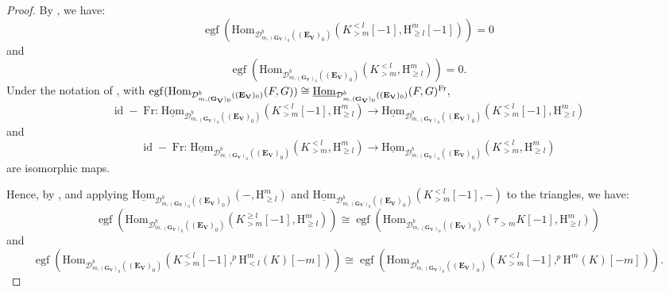 \documentclass[10pt,a4paper]{amsart}
\def\Hom{\mbox{\rm Hom}}  \def\ap{\mbox{\rm ap}}
\begin{document}
\begin{proof}
By \cite[Lemma 5.4.14(1)]{Pramod-2021}, we have:
\[
\operatorname{egf}\left(\mathrm{Hom}_{\mathcal{D}^b_{m,(\mathbf{G}_{\mathbf{V}})_0}((\mathbf{E}_{\mathbf{V}})_0)}(K_{>m}^{<l}[-1],\mathrm{H}^m_{\geq l}[-1])\right)=0
\]
and
\[
\operatorname{egf}\left(\mathrm{Hom}_{\mathcal{D}^b_{m,(\mathbf{G}_{\mathbf{V}})_0}((\mathbf{E}_{\mathbf{V}})_0)}(K_{>m}^{<l},\mathrm{H}^m_{\geq l})\right)=0.
\]
Under the notation of \cite[Remark 5.3.5]{Pramod-2021}, with $\operatorname{egf}(\Hom_{\mathcal{D}^b_{m,(\mathbf{G}_{\mathbf{V}})_0}((\mathbf{E}_{\mathbf{V}})_0)}(F,G))\cong \underline{\Hom}_{\mathcal{D}^b_{m,(\mathbf{G}_{\mathbf{V}})_0}((\mathbf{E}_{\mathbf{V}})_0)}(F,G)^{\operatorname{Fr}},$ $$\operatorname{id}-\operatorname{Fr:}\underline{\mathrm{Hom}}_{\mathcal{D}^b_{m,(\mathbf{G}_{\mathbf{V}})_0}((\mathbf{E}_{\mathbf{V}})_0)}(K_{>m}^{<l}[-1],\mathrm{H}^m_{\geq l})\rightarrow\underline{\mathrm{Hom}}_{\mathcal{D}^b_{m,(\mathbf{G}_{\mathbf{V}})_0}((\mathbf{E}_{\mathbf{V}})_0)}(K_{>m}^{<l}[-1],\mathrm{H}^m_{\geq l})$$ and $$\operatorname{id}-\operatorname{Fr:}\underline{\mathrm{Hom}}_{\mathcal{D}^b_{m,(\mathbf{G}_{\mathbf{V}})_0}((\mathbf{E}_{\mathbf{V}})_0)}(K_{>m}^{<l},\mathrm{H}^m_{\geq l})\rightarrow\underline{\mathrm{Hom}}_{\mathcal{D}^b_{m,(\mathbf{G}_{\mathbf{V}})_0}((\mathbf{E}_{\mathbf{V}})_0)}(K_{>m}^{<l},\mathrm{H}^m_{\geq l})$$ are isomorphic maps.

Hence, by \cite[Remark 5.3.5]{Pramod-2021}, and applying $\underline{\mathrm{Hom}}_{\mathcal{D}^b_{m,(\mathbf{G}_{\mathbf{V}})_0}((\mathbf{E}_{\mathbf{V}})_0)}(-,\mathrm{H}^m_{\geq l})$ and $\underline{\mathrm{Hom}}_{\mathcal{D}^b_{m,(\mathbf{G}_{\mathbf{V}})_0}((\mathbf{E}_{\mathbf{V}})_0)}(K_{>m}^{<l}[-1],-)$ to the triangles, we have:
\[
\operatorname{egf}\left(\mathrm{Hom}_{\mathcal{D}^b_{m,(\mathbf{G}_{\mathbf{V}})_0}((\mathbf{E}_{\mathbf{V}})_0)}(K_{>m}^{\geq l}[-1],\mathrm{H}^m_{\geq l})\right)
\cong
\operatorname{egf}\left(\mathrm{Hom}_{\mathcal{D}^b_{m,(\mathbf{G}_{\mathbf{V}})_0}((\mathbf{E}_{\mathbf{V}})_0)}(\tau_{>m}K[-1],\mathrm{H}^m_{\geq l})\right)
\]
and
\[
\operatorname{egf}\left(\mathrm{Hom}_{\mathcal{D}^b_{m,(\mathbf{G}_{\mathbf{V}})_0}((\mathbf{E}_{\mathbf{V}})_0)}(K_{>m}^{<l}[-1],^{p}\mathrm{H}^m_{<l}(K)[-m])\right)
\cong
\operatorname{egf}\left(\mathrm{Hom}_{\mathcal{D}^b_{m,(\mathbf{G}_{\mathbf{V}})_0}((\mathbf{E}_{\mathbf{V}})_0)}(K_{>m}^{<l}[-1],^{p}\mathrm{H}^m(K)[-m])\right).
\]


\end{proof}
\end{document}
